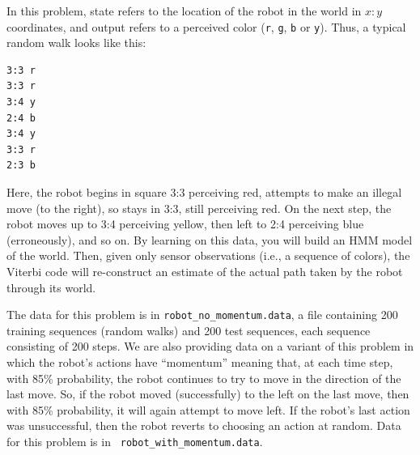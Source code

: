 \documentclass[submit]{harvardml}
\begin{document}
In this problem, state refers to the location of the robot in the
world in $x:y$ coordinates, and output refers to a perceived color
({\tt r}, {\tt g}, {\tt b} or {\tt y}). Thus, a typical random walk
looks like this:



\begin{verbatim}
3:3 r
3:3 r
3:4 y
2:4 b
3:4 y
3:3 r
2:3 b
\end{verbatim}

Here, the robot begins in square 3:3 perceiving red, attempts to make
an illegal move (to the right), so stays in 3:3, still perceiving red.
On the next step, the robot moves up to 3:4 perceiving yellow, then
left to 2:4 perceiving blue (erroneously), and so on. By learning
on this data, you will build an HMM model of the world.
Then, given only sensor observations (i.e., a sequence of colors), the
Viterbi code will re-construct an estimate of the actual path taken by
the robot through its world.

The data for this problem is in {\tt robot\_no\_momentum.data}, a file
containing 200 training sequences (random walks) and 200 test
sequences, each sequence consisting of 200 steps. We are also
providing data on a variant of this problem in which the robot's
actions have ``momentum'' meaning that, at each time step, with 85\%
probability, the robot continues to try to move in the direction of the last
move.  So, if the robot moved (successfully) to the left on the last
move, then with 85\% probability, it will again attempt to move left.
If the robot's last action was unsuccessful, then the robot reverts to
choosing an action at random.  Data for this problem is in {\tt
  robot\_with\_momentum.data}.


\pagebreak



\end{document}
